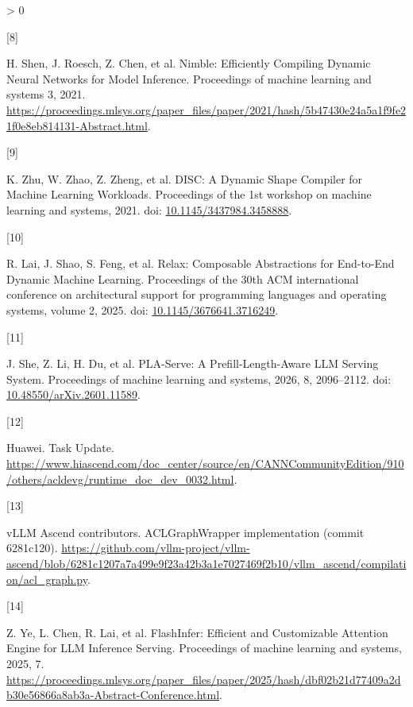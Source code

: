 \documentclass[UTF8,10.5pt,fontset=windows]{ctexart}
\newlength{\cslhangindent}
\newlength{\csllabelwidth}
\newenvironment{CSLReferences}[2] %
 {%
  \setlength{\parindent}{0pt}
  \ifodd #1 \everypar{\setlength{\hangindent}{\cslhangindent}}\ignorespaces\fi
  \ifnum #2 > 0
  \setlength{\parskip}{#2\baselineskip}
  \fi
 }%
 {}
\newcommand{\CSLLeftMargin}[1]{\parbox[t]{\csllabelwidth}{#1}}
\newcommand{\CSLRightInline}[1]{\parbox[t]{\linewidth - \csllabelwidth}{#1}\break}
\begin{document}
\begin{CSLReferences}{0}{0}
\leavevmode{}%
\CSLLeftMargin{{[}8{]} }
\CSLRightInline{H. Shen, J. Roesch, Z. Chen, et al. {Nimble: Efficiently
Compiling Dynamic Neural Networks for Model Inference}. Proceedings of
machine learning and systems 3, 2021.
\url{https://proceedings.mlsys.org/paper_files/paper/2021/hash/5b47430e24a5a1f9fe21f0e8eb814131-Abstract.html}.}

\leavevmode{}%
\CSLLeftMargin{{[}9{]} }
\CSLRightInline{K. Zhu, W. Zhao, Z. Zheng, et al. {DISC: A Dynamic Shape
Compiler for Machine Learning Workloads}. Proceedings of the 1st
workshop on machine learning and systems, 2021. doi:
\href{https://doi.org/10.1145/3437984.3458888}{10.1145/3437984.3458888}.}

\leavevmode{}%
\CSLLeftMargin{{[}10{]} }
\CSLRightInline{R. Lai, J. Shao, S. Feng, et al. {Relax: Composable
Abstractions for End-to-End Dynamic Machine Learning}. Proceedings of
the 30th ACM international conference on architectural support for
programming languages and operating systems, volume 2, 2025. doi:
\href{https://doi.org/10.1145/3676641.3716249}{10.1145/3676641.3716249}.}

\leavevmode{}%
\CSLLeftMargin{{[}11{]} }
\CSLRightInline{J. She, Z. Li, H. Du, et al. {PLA-Serve: A
Prefill-Length-Aware LLM Serving System}. Proceedings of machine
learning and systems, 2026, 8, 2096--2112. doi:
\href{https://doi.org/10.48550/arXiv.2601.11589}{10.48550/arXiv.2601.11589}.}

\leavevmode{}%
\CSLLeftMargin{{[}12{]} }
\CSLRightInline{Huawei. {Task Update}.
\url{https://www.hiascend.com/doc_center/source/en/CANNCommunityEdition/910/others/acldevg/runtime_doc_dev_0032.html}.}

\leavevmode{}%
\CSLLeftMargin{{[}13{]} }
\CSLRightInline{vLLM Ascend contributors. {ACLGraphWrapper
implementation (commit 6281c120)}.
\url{https://github.com/vllm-project/vllm-ascend/blob/6281c1207a7a499e9f23a42b3a1e7027469f2b10/vllm_ascend/compilation/acl_graph.py}.}

\leavevmode{}%
\CSLLeftMargin{{[}14{]} }
\CSLRightInline{Z. Ye, L. Chen, R. Lai, et al. {FlashInfer: Efficient
and Customizable Attention Engine for LLM Inference Serving}.
Proceedings of machine learning and systems, 2025, 7.
\url{https://proceedings.mlsys.org/paper_files/paper/2025/hash/dbf02b21d77409a2db30e56866a8ab3a-Abstract-Conference.html}.}


\end{CSLReferences}
\end{document}
